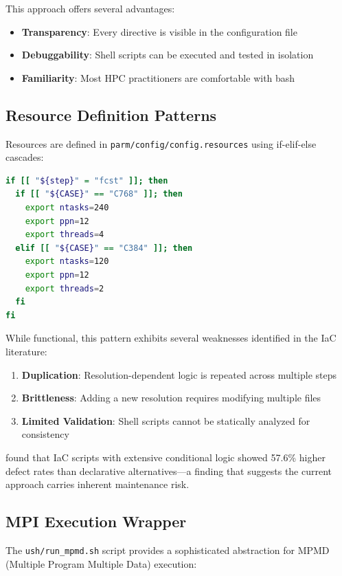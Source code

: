 \documentclass[11pt,twocolumn]{article}
\begin{document}
This approach offers several advantages:
\begin{itemize}
    \item \textbf{Transparency}: Every directive is visible in the configuration file
    \item \textbf{Debuggability}: Shell scripts can be executed and tested in isolation
    \item \textbf{Familiarity}: Most HPC practitioners are comfortable with bash
\end{itemize}

\subsection{Resource Definition Patterns}

Resources are defined in \texttt{parm/config/config.resources} using if-elif-else cascades:

\begin{lstlisting}[language=Bash, caption={Imperative Resource Selection}]
if [[ "${step}" = "fcst" ]]; then
  if [[ "${CASE}" == "C768" ]]; then
    export ntasks=240
    export ppn=12
    export threads=4
  elif [[ "${CASE}" == "C384" ]]; then
    export ntasks=120
    export ppn=12
    export threads=2
  fi
fi
\end{lstlisting}

While functional, this pattern exhibits several weaknesses identified in the IaC literature:

\begin{enumerate}
    \item \textbf{Duplication}: Resolution-dependent logic is repeated across multiple steps
    \item \textbf{Brittleness}: Adding a new resolution requires modifying multiple files
    \item \textbf{Limited Validation}: Shell scripts cannot be statically analyzed for consistency
\end{enumerate}

\cite{rahman2018iac_defects} found that IaC scripts with extensive conditional logic showed 57.6\% higher defect rates than declarative alternatives---a finding that suggests the current approach carries inherent maintenance risk.

\subsection{MPI Execution Wrapper}

The \texttt{ush/run\_mpmd.sh} script provides a sophisticated abstraction for MPMD (Multiple Program Multiple Data) execution:
\end{document}
